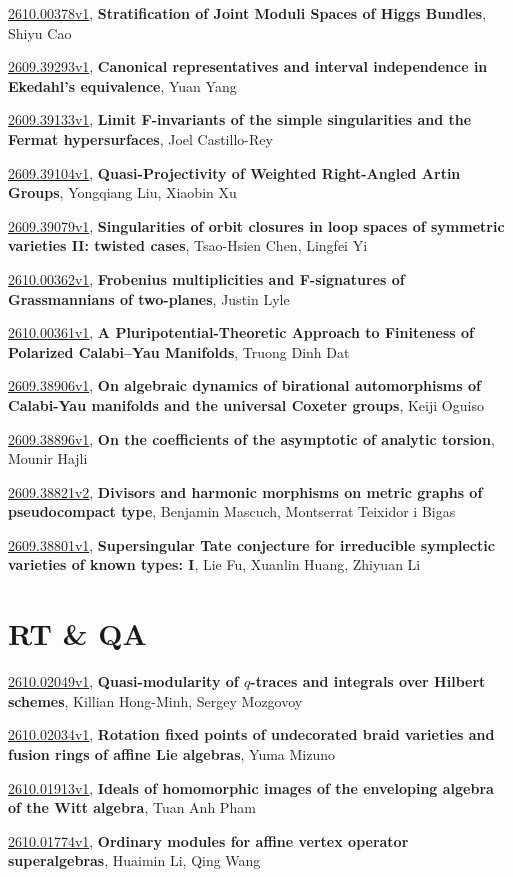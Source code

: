 \documentclass[9pt, a4paper]{article}
\theoremstyle{plain}
\theoremstyle{definition}
\theoremstyle{remark}
\newcommand{\arxiv}[3]{\href{https://arxiv.org/abs/#1}{#1}, \textbf{\textcolor{arxivblue}{#2}}, #3}
\begin{document}
\arxiv{2610.00378v1}{Stratification of Joint Moduli Spaces of Higgs Bundles}{Shiyu Cao}

\arxiv{2609.39293v1}{Canonical representatives and interval independence in Ekedahl's equivalence}{Yuan Yang}

\arxiv{2609.39133v1}{Limit F-invariants of the simple singularities and the Fermat hypersurfaces}{Joel Castillo-Rey}

\arxiv{2609.39104v1}{Quasi-Projectivity of Weighted Right-Angled Artin Groups}{Yongqiang Liu, Xiaobin Xu}

\arxiv{2609.39079v1}{Singularities of orbit closures in loop spaces of symmetric varieties II: twisted cases}{Tsao-Hsien Chen, Lingfei Yi}

\arxiv{2610.00362v1}{Frobenius multiplicities and F-signatures of Grassmannians of two-planes}{Justin Lyle}

\arxiv{2610.00361v1}{A Pluripotential-Theoretic Approach to Finiteness of Polarized Calabi--Yau Manifolds}{Truong Dinh Dat}

\arxiv{2609.38906v1}{On algebraic dynamics of birational automorphisms of Calabi-Yau manifolds and the universal Coxeter groups}{Keiji Oguiso}

\arxiv{2609.38896v1}{On the coefficients of the asymptotic of analytic torsion}{Mounir Hajli}

\arxiv{2609.38821v2}{Divisors and harmonic morphisms on metric graphs of pseudocompact type}{Benjamin Mascuch, Montserrat Teixidor i Bigas}

\arxiv{2609.38801v1}{Supersingular Tate conjecture for irreducible symplectic varieties of known types: I}{Lie Fu, Xuanlin Huang, Zhiyuan Li}


\section{RT \& QA}
\arxiv{2610.02049v1}{Quasi-modularity of $q$-traces and integrals over Hilbert schemes}{Killian Hong-Minh, Sergey Mozgovoy}

\arxiv{2610.02034v1}{Rotation fixed points of undecorated braid varieties and fusion rings of affine Lie algebras}{Yuma Mizuno}

\arxiv{2610.01913v1}{Ideals of homomorphic images of the enveloping algebra of the Witt algebra}{Tuan Anh Pham}

\arxiv{2610.01774v1}{Ordinary modules for affine vertex operator superalgebras}{Huaimin Li, Qing Wang}
\end{document}
